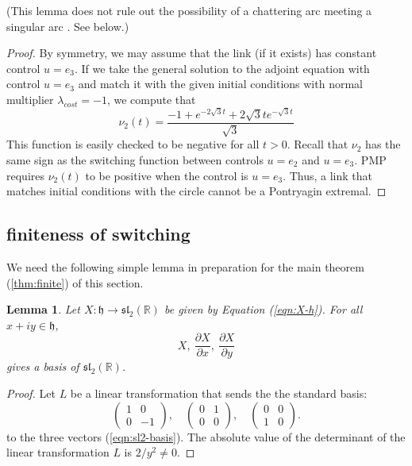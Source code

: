 \documentclass{article}
\newtheorem{lemma}[theorem]{Lemma}
\theoremstyle{remark}
\newcommand{\ring}[1]{\mathbb{#1}}
\def\sl{\mathfrak{sl}_2(\ring{R})}
\def\h{\mathfrak h}
\newcommand{\partials}[2]{\frac{\partial #1}{\partial #2}}
\begin{document}
(This lemma does not rule out the possibility of a chattering arc
meeting a singular arc \cite[Fig.20.1]{agrachev2013control}.  See
below.)

\begin{proof} 
By symmetry, we may assume that the link (if
it exists) has constant control $u=e_3$.
If we take the general solution to the adjoint equation
  with control $u=e_3$ and match it with the given initial
  conditions with normal multiplier $\lambda_{cost}=-1$, we compute that
\[
\nu_2(t) = \frac{-1 + e^{-2\sqrt{3} t} + 2 \sqrt{3} t e^{-\sqrt{3} t}}{\sqrt{3}}
\]
This function is easily checked to be negative for all $t>0$.  Recall
that $\nu_2$ has the same sign as the switching function between
controls $u=e_2$ and $u=e_3$.  PMP requires $\nu_2(t)$ to
be positive when the control is $u=e_3$.  Thus, a link that
matches initial conditions with the circle cannot be a Pontryagin
extremal.
\end{proof}


\subsection{finiteness of switching}


We need the  following simple lemma in preparation for the main
theorem (\ref{thm:finite}) of this section.

\begin{lemma}\label{lemma:sl2-basis}
Let $X:\h\to\sl$ be given by Equation (\ref{eqn:X-h}).
For all $x+iy\in\h$,
\begin{equation}\label{eqn:sl2-basis}
X,~\partials {X}{ x},~\partials {X}{ y}
\end{equation}
gives a basis of $\sl$.
\end{lemma}

\begin{proof}
Let $L$ be a linear transformation that sends the
the standard basis:
\[
\begin{pmatrix}1&0\\0&-1\end{pmatrix},
\quad
\begin{pmatrix}0&1\\0&0\end{pmatrix},
\quad
\begin{pmatrix}0&0\\1&0\end{pmatrix}.
\]
to the three vectors (\ref{eqn:sl2-basis}).  
The absolute value of the determinant of the linear
transformation $L$ is $2/y^2\ne0$.
\end{proof}
\end{document}
